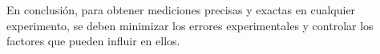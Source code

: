 \documentclass[letterpaper]{IEEEconf}
\begin{document}
En conclusión, para obtener mediciones precisas y exactas en cualquier experimento, se deben minimizar los errores experimentales y controlar los factores que pueden influir en ellos.

\printbibliography %



\end{document}

